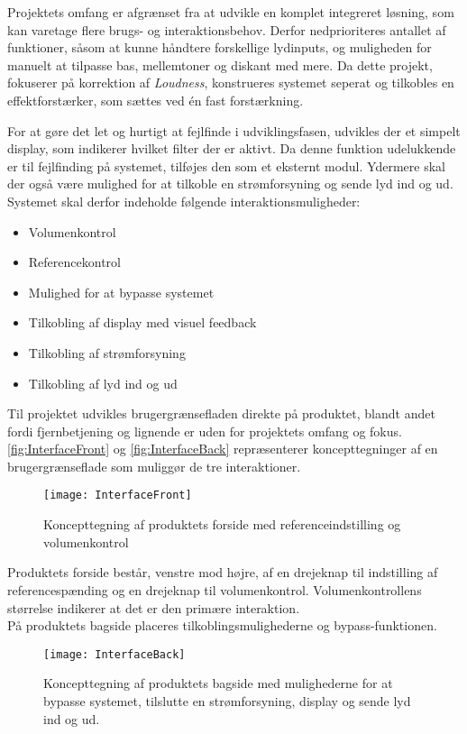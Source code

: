 Projektets omfang er afgrænset fra at udvikle en komplet integreret løsning, som kan varetage flere brugs- og interaktionsbehov. Derfor nedprioriteres antallet af funktioner, såsom at kunne håndtere forskellige lydinputs, og muligheden for manuelt at tilpasse bas, mellemtoner og diskant med mere. Da dette projekt, fokuserer på korrektion af \textit{Loudness}, konstrueres systemet seperat og tilkobles en effektforstærker, som sættes ved én fast forstærkning.\par
 For at gøre det let og hurtigt at fejlfinde i udviklingsfasen, udvikles der et simpelt display, som indikerer hvilket filter der er aktivt. Da denne funktion udelukkende er til fejlfinding på systemet, tilføjes den som et eksternt modul. Ydermere skal der også være mulighed for at tilkoble en strømforsyning og sende lyd ind og ud.
%
\newpage
\noindent
%
Systemet skal derfor indeholde følgende interaktionsmuligheder:
\blankline
\begin{itemize}
  \item Volumenkontrol
  \item Referencekontrol 
  \item Mulighed for at bypasse systemet
  \item Tilkobling af display med visuel feedback
  \item Tilkobling af strømforsyning
  \item Tilkobling af lyd ind og ud
\end{itemize}
\blankline
Til projektet udvikles brugergrænsefladen direkte på produktet, blandt andet fordi fjernbetjening og lignende er uden for projektets omfang og fokus. \autoref{fig:InterfaceFront} og \autoref{fig:InterfaceBack} repræsenterer koncepttegninger af en brugergrænseflade som muliggør de tre interaktioner.
%
\begin{figure}[H]
	\centering
	\texttt{[image: InterfaceFront]}
	\caption{Koncepttegning af produktets forside med referenceindstilling og volumenkontrol}
	\label{fig:InterfaceFront}
\end{figure}
\noindent
Produktets forside består, venstre mod højre, af en drejeknap til indstilling af referencespænding og en drejeknap til volumenkontrol. Volumenkontrollens størrelse indikerer at det er den primære interaktion.\\
På produktets bagside placeres tilkoblingsmulighederne og bypass-funktionen.
\begin{figure}[H]
	\centering
	\texttt{[image: InterfaceBack]}
	\caption{Koncepttegning af produktets bagside med mulighederne for at bypasse systemet, tilslutte en strømforsyning, display og sende lyd ind og ud.}
	\label{fig:InterfaceBack}
\end{figure}
